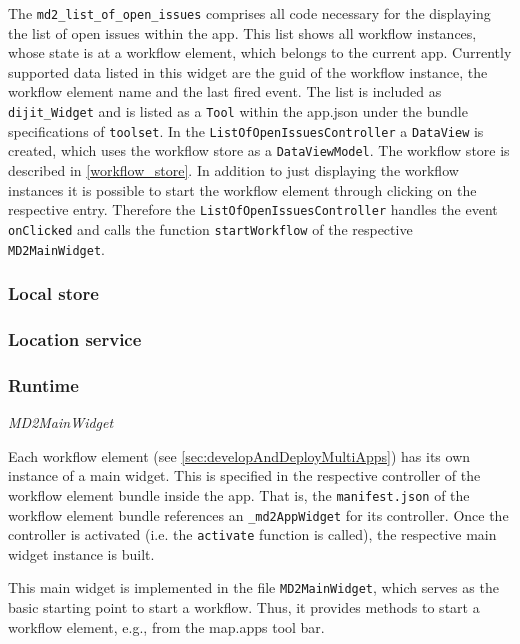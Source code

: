 The \texttt{md2\_list\_of\_open\_issues} comprises all code necessary for the displaying the list of open issues within the app. This list shows all workflow instances, whose state is at a workflow element, which belongs to the current app. Currently supported data listed in this widget are the guid of the workflow instance, the workflow element name and the last fired event. 
The list is included as \texttt{dijit\_Widget} and is listed as a \texttt{Tool} within the app.json under the bundle specifications of \texttt{toolset}. In the \texttt{ListOfOpenIssuesController} a \texttt{DataView} is created, which uses the workflow store as a \texttt{DataViewModel}. The workflow store is described in \cref{workflow_store}.
In addition to just displaying the workflow instances it is possible to start the workflow element through clicking on the respective entry. Therefore the \texttt{ListOfOpenIssuesController} handles the event \texttt{onClicked} and calls the function \texttt{startWorkflow} of the respective \texttt{MD2MainWidget}.

\subsubsection{Local store}

\subsubsection{Location service}

\subsubsection{Runtime}

\textit{MD2MainWidget}

Each workflow element (see \ref{sec:developAndDeployMultiApps}) has its own instance of a \MD main widget. This is specified in the respective controller of the workflow element bundle inside the app. That is, the \texttt{manifest.json} of the workflow element bundle references an \texttt{\_md2AppWidget} for its controller. Once the controller is activated (i.e. the \texttt{activate} function is called), the respective \MD main widget instance is built. 

This \MD main widget is implemented in the file \texttt{MD2MainWidget}, which serves as the basic starting point to start a workflow. Thus, it provides methods to start a workflow element, e.g., from the map.apps tool bar.

